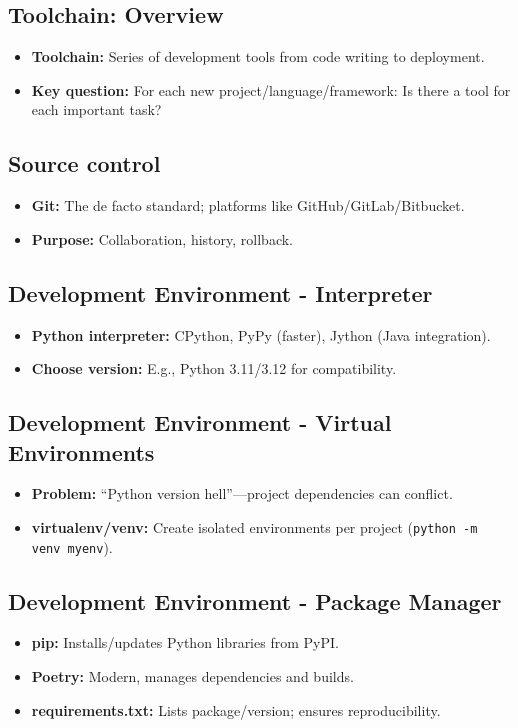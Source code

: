 \documentclass[11pt,a4paper]{article}
\begin{document}
\subsection*{Toolchain: Overview}
\begin{itemize}
    \item \textbf{Toolchain:} Series of development tools from code writing to deployment.
    \item \textbf{Key question:} For each new project/language/framework: Is there a tool for each important task?
\end{itemize}

\subsection*{Source control}
\begin{itemize}
    \item \textbf{Git:} The de facto standard; platforms like GitHub/GitLab/Bitbucket.
    \item \textbf{Purpose:} Collaboration, history, rollback.
\end{itemize}

\subsection*{Development Environment - Interpreter}
\begin{itemize}
    \item \textbf{Python interpreter:} CPython, PyPy (faster), Jython (Java integration).
    \item \textbf{Choose version:} E.g., Python 3.11/3.12 for compatibility.
\end{itemize}

\subsection*{Development Environment - Virtual Environments}
\begin{itemize}
    \item \textbf{Problem:} “Python version hell”—project dependencies can conflict.
    \item \textbf{virtualenv/venv:} Create isolated environments per project (\texttt{python -m venv myenv}).
\end{itemize}

\subsection*{Development Environment - Package Manager}
\begin{itemize}
    \item \textbf{pip:} Installs/updates Python libraries from PyPI.
    \item \textbf{Poetry:} Modern, manages dependencies and builds.
    \item \textbf{requirements.txt:} Lists package/version; ensures reproducibility.
\end{itemize}
\end{document}
